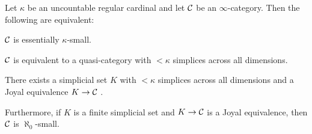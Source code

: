 \begin{lem}\label{lem:KappaSmall}
	Let $\kappa$ be an uncountable regular cardinal and let $\mathcal{C}$ be an $\infty$-category. Then the following are equivalent:
	\begin{alphanumerate}
		\item $\mathcal{C}$ is essentially $\kappa$-small.\label{enum:KappaSmallA}
		\item $\mathcal{C}$ is equivalent to a quasi-category with $<\kappa$ simplices across all dimensions.\label{enum:KappaSmallB}
		\item \!There exists a simplicial set $K$ with $<\kappa$ simplices across all dimensions and a Joyal equivalence $K\rightarrow \mathcal{C}$ .\label{enum:KappaSmallC}
	\end{alphanumerate}
	Furthermore, if $K$ is a finite simplicial set  and $K\rightarrow \mathcal{C}$ is a Joyal equivalence, then $\mathcal{C}$ is $\aleph_0$-small.
\end{lem}
